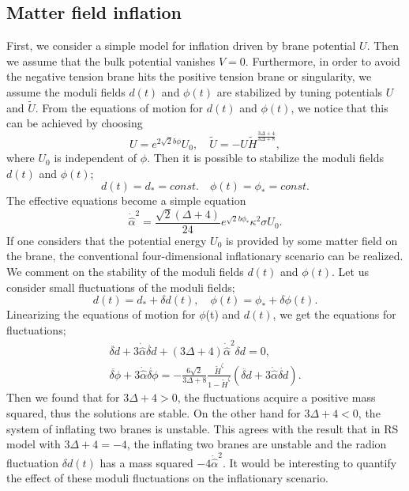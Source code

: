 \documentclass[a4paper,11pt]{article}
\begin{document}
\subsection{Matter field inflation}
First, we consider a simple model for inflation 
driven by brane potential $U$. Then we assume that
the bulk potential vanishes $V=0$. Furthermore, in order to
avoid the negative tension brane hits the positive tension
brane or singularity, we assume the moduli fields $d(t)$ and 
$\phi(t)$ are stabilized by tuning potentials $U$ and $\tilde{U}$. 
From the equations of motion for $d(t)$ and $\phi(t)$, 
we notice that this can be achieved by choosing 
\begin{equation}
U=e^{2 \sqrt{2} b \phi} U_0, \quad 
\tilde{U}=-U \tilde{H}^{\frac{3 \Delta+4}{3 \Delta+8}},
\end{equation}
where $U_0$ is independent of $\phi$. Then 
it is possible to stabilize the moduli fields $d(t)$ and $\phi(t)$;
\begin{equation}
d(t)=d_{\ast}=const. \quad \phi(t)=\phi_{\ast}=const.
\end{equation}
The effective equations become a simple equation
\begin{equation}
\dot{\hat{\alpha}}^2= \frac{\sqrt{2} (\Delta+4)}{24}e^{\sqrt{2} b \phi_{\ast}}
 \kappa^2 \sigma U_0.
\end{equation}
If one considers that the potential energy $U_0$ is provided by some
matter field on the brane, the conventional four-dimensional inflationary 
scenario can be realized. We comment on the stability of the moduli 
fields $d(t)$ and $\phi(t)$. Let us consider small fluctuations of the 
moduli fields;
\begin{equation}
d(t)=d_{\ast}+\delta d(t),\quad \phi(t)=\phi_{\ast}+\delta \phi(t).
\end{equation}
Linearizing the equations of motion for $\phi$(t) and $d(t)$, we get the 
equations for fluctuations;
\begin{eqnarray}
\ddot{\delta d}+3 \dot{\hat{\alpha}} \dot{\delta d}
+(3\Delta+4) \dot{\hat{\alpha}}^2 
\delta d=0, \\
\ddot{\delta \phi}+3 \dot{\hat{\alpha}} \dot{\delta \phi}=
-\frac{6 \sqrt{2}}{3 \Delta+8} 
\frac{\tilde{H}^{\zeta}}{1-\tilde{H}^{\zeta}} 
(\ddot{\delta d}+3 \dot{\hat{\alpha}} \dot{\delta d}).
\end{eqnarray}
Then we found that for $3 \Delta +4 >0$, the fluctuations acquire
a positive mass squared, thus the solutions are stable. On the 
other hand for $3 \Delta +4 <0$, the system of inflating two branes 
is unstable. This agrees with the result that in RS model with 
$3 \Delta +4=-4$, the inflating two branes are unstable and 
the  radion fluctuation $\delta d(t)$ has a mass squared 
$-4 \dot{\hat{\alpha}}^2$. It would be interesting to quantify 
the effect of these moduli fluctuations on the inflationary 
scenario. 
\end{document}
